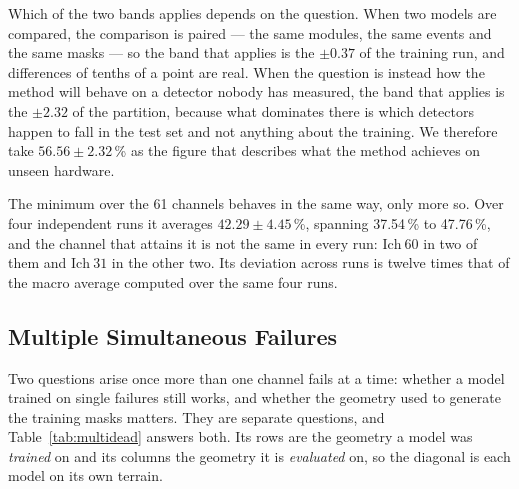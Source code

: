 \documentclass[10pt,conference]{IEEEtran}
\begin{document}
Which of the two bands applies depends on the question. When two models are
compared, the comparison is paired --- the same modules, the same events and the
same masks --- so the band that applies is the $\pm 0.37$ of the training run,
and differences of tenths of a point are real. When the question is instead how
the method will behave on a detector nobody has measured, the band that applies
is the $\pm 2.32$ of the partition, because what dominates there is which
detectors happen to fall in the test set and not anything about the training.
We therefore take $56.56 \pm 2.32$\,\% as the figure that describes
what the method achieves on unseen hardware.

The minimum over the 61 channels behaves in the same way, only more so. Over
four independent runs it averages $42.29 \pm 4.45$\,\%, spanning 37.54\,\% to
47.76\,\%, and the channel that attains it is not the same in every run:
$\mathrm{Ich}\ 60$ in two of them and $\mathrm{Ich}\ 31$ in the other two. Its
deviation across runs is twelve times that of the macro average computed over
the same four runs.

\subsection{Multiple Simultaneous Failures}
\label{sec:res-multidead}

Two questions arise once more than one channel fails at a time: whether a model
trained on single failures still works, and whether the geometry used to
generate the training masks matters. They are separate questions, and
Table~\ref{tab:multidead} answers both. Its rows are the geometry a model was
\emph{trained} on and its columns the geometry it is \emph{evaluated} on, so the
diagonal is each model on its own terrain.
\end{document}
